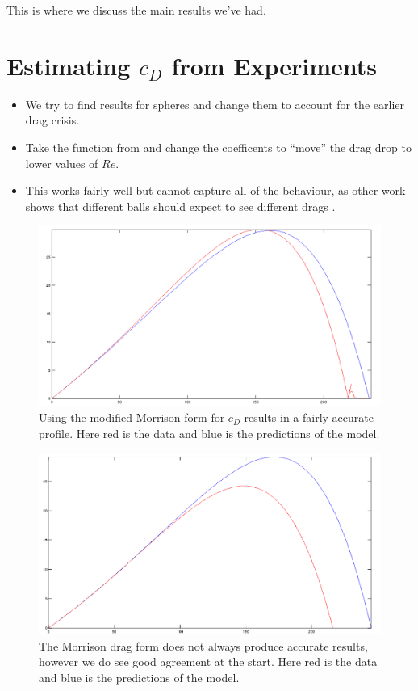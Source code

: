 This is where we discuss the main results we've had.

\section{Estimating $c_{D}$ from Experiments}

\begin{itemize}
\item We try to find results for spheres and change them to account for the earlier drag crisis.
\item Take the function from \citet{Morrison2010} and change the coefficents to ``move'' the drag 
drop to lower values of $Re$.
\item This works fairly well but cannot capture all of the behaviour, as other work shows that
different balls should expect to see different drags \citet{Alam2011}.
\end{itemize}

\begin{figure}[h]
\centering
\includegraphics[scale=0.45]{../images/trajectory-older.png}
\caption[Model with $c_{D}$ dependent on $Re$.]{Using the modified Morrison form for $c_{D}$ results 
in a fairly accurate profile. Here red is the data and blue is the predictions of the model.}
\end{figure}

\begin{figure}[h]
\centering
\includegraphics[scale=0.45]{../images/trajectory.png}
\caption[Second data set with Morrison drag.]{The Morrison drag form does not always produce accurate
results, however we do see good agreement at the start. Here red is the data and blue is the 
predictions of the model.}
\end{figure}

